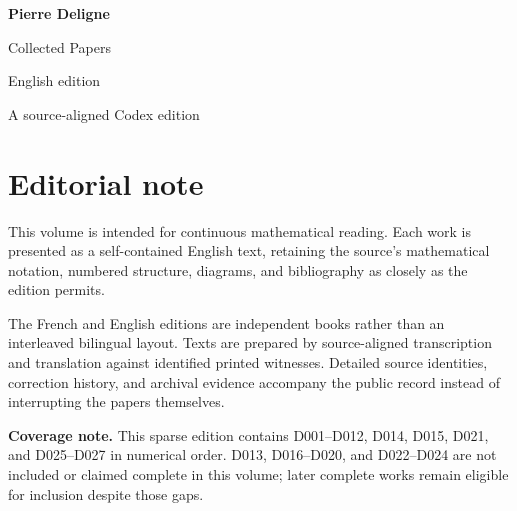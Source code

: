 \documentclass[11pt,a4paper]{article}
\begin{document}
\begin{titlepage}
  \pagecolor{DeligneBlue}
  \color{white}
  \vspace*{34mm}
  {\fontsize{30}{36}\selectfont\bfseries Pierre Deligne\par}
  \vspace{7mm}
  {\fontsize{18}{23}\selectfont Collected Papers\par}
  \vspace{4mm}
  {\large English edition\par}
  \vfill
  {\normalsize A source-aligned Codex edition\par}
\end{titlepage}
\setcounter{page}{2}
\nopagecolor
\color{DeligneInk}
\section*{Editorial note}
This volume is intended for continuous mathematical reading. Each work is presented as a self-contained English text, retaining the source's mathematical notation, numbered structure, diagrams, and bibliography as closely as the edition permits.

The French and English editions are independent books rather than an interleaved bilingual layout. Texts are prepared by source-aligned transcription and translation against identified printed witnesses. Detailed source identities, correction history, and archival evidence accompany the public record instead of interrupting the papers themselves.

\textbf{Coverage note.} This sparse edition contains D001--D012, D014, D015, D021, and D025--D027 in numerical order. D013, D016--D020, and D022--D024 are not included or claimed complete in this volume; later complete works remain eligible for inclusion despite those gaps.
\end{document}
